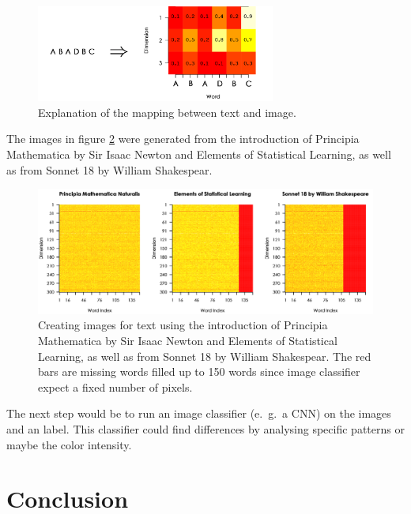 \begin{enumerate}
\begin{figure}[!h]
\centering
\includegraphics[width=0.7\textwidth]{images/image_classif.png} 
\caption[Example of the text to image procedure.]{Explanation of the mapping 
         between text and image.}
\label{fig:text-classif}
\end{figure}
\end{enumerate}

The images in figure \ref{fig:text-classif-images} were generated from the
introduction of Principia Mathematica by Sir Isaac Newton and Elements of 
Statistical Learning, as well as from Sonnet 18 by William Shakespear. \\

\begin{figure}[!h]
\centering
\includegraphics[width=\textwidth]{images/text_images.png} 
\caption[Specific text representation via images.]{Creating images for text using 
         the introduction of Principia Mathematica by Sir Isaac Newton and 
         Elements of Statistical Learning, as well as from Sonnet 18 by William 
         Shakespear. The red bars are missing words filled up to 150 words since 
         image classifier expect a fixed number of pixels.}
\label{fig:text-classif-images}
\end{figure}

The next step would be to run an image classifier (e.~g.~a CNN) on the images
and an label. This classifier could find differences by analysing specific patterns
or maybe the color intensity.

\section{Conclusion}

